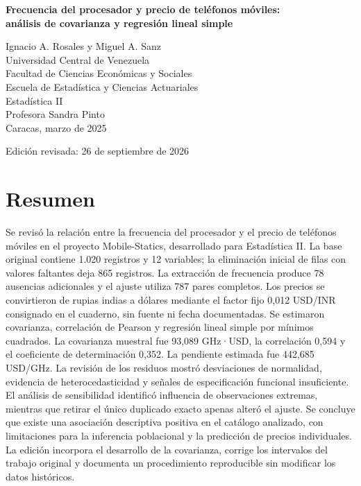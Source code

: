 \documentclass[12pt,letterpaper]{article}
\begin{document}
\RaggedRight\setlength{\parindent}{0.5in}
\begin{center}
\vspace*{0.8in}
\textbf{Frecuencia del procesador y precio de teléfonos móviles:\\análisis de covarianza y regresión lineal simple}

\vspace{\baselineskip}
Ignacio A. Rosales y Miguel A. Sanz\\
Universidad Central de Venezuela\\
Facultad de Ciencias Económicas y Sociales\\
Escuela de Estadística y Ciencias Actuariales\\
Estadística II\\
Profesora Sandra Pinto\\
Caracas, marzo de 2025

\vspace{\baselineskip}
Edición revisada: 26 de septiembre de 2026
\end{center}

\clearpage
\section*{Resumen}
\noindent Se revisó la relación entre la frecuencia del procesador y el precio de teléfonos móviles en el proyecto Mobile-Statics, desarrollado para Estadística II. La base original contiene 1.020 registros y 12 variables; la eliminación inicial de filas con valores faltantes deja 865 registros. La extracción de frecuencia produce 78 ausencias adicionales y el ajuste utiliza 787 pares completos. Los precios se convirtieron de rupias indias a dólares mediante el factor fijo 0,012 USD/INR consignado en el cuaderno, sin fuente ni fecha documentadas. Se estimaron covarianza, correlación de Pearson y regresión lineal simple por mínimos cuadrados. La covarianza muestral fue 93,089 GHz·USD, la correlación 0,594 y el coeficiente de determinación 0,352. La pendiente estimada fue 442,685 USD/GHz. La revisión de los residuos mostró desviaciones de normalidad, evidencia de heterocedasticidad y señales de especificación funcional insuficiente. El análisis de sensibilidad identificó influencia de observaciones extremas, mientras que retirar el único duplicado exacto apenas alteró el ajuste. Se concluye que existe una asociación descriptiva positiva en el catálogo analizado, con limitaciones para la inferencia poblacional y la predicción de precios individuales. La edición incorpora el desarrollo de la covarianza, corrige los intervalos del trabajo original y documenta un procedimiento reproducible sin modificar los datos históricos.
\end{document}
